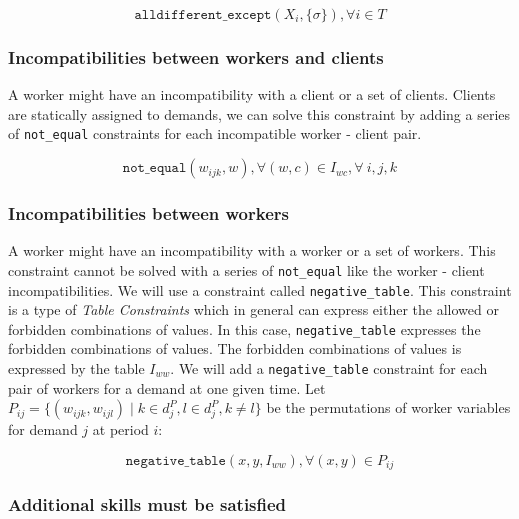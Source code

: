 \documentclass[../../thesis.tex]{subfiles}
\begin{document}
\begin{equation}
  \texttt{alldifferent\_except}(X_i, \{ \sigma \}), \forall i \in T
\end{equation}

\subsubsection{Incompatibilities between workers and clients}

A worker might have an incompatibility with a client or a set of clients. 
Clients are statically assigned to demands, we can solve this constraint by adding 
a series of \texttt{not\_equal} constraints for each incompatible worker - client pair.

\begin{equation}
  \texttt{not\_equal}(w_{ijk}, w), \forall (w, c) \in I_{wc}, \forall \ i, j, k
\end{equation}

\subsubsection{Incompatibilities between workers}

A worker might have an incompatibility with a worker or a set of workers. This constraint cannot be solved 
with a series of \texttt{not\_equal} like the worker - client incompatibilities. We will use a constraint 
called \texttt{negative\_table}. This constraint is a type of \emph{Table Constraints} \cite{Henteryck:Table} which in general can
express either the allowed or forbidden combinations of values. In this case, \texttt{negative\_table} expresses the forbidden combinations of values.
The forbidden combinations of values is expressed by the table $I_{ww}$. 
We will add a \texttt{negative\_table} constraint for each pair of workers for a demand at one given time. Let $P_{ij} = \{ (w_{ijk}, w_{ijl}) \mid k \in d_j^P, l \in d_j^P, k \neq l \}$ 
be the permutations of worker variables for demand $j$ at period $i$:

\begin{equation}
  \texttt{negative\_table}(x, y, I_{ww}),  \forall (x, y) \in P_{ij}
\end{equation}

\subsubsection{Additional skills must be satisfied}
\end{document}
